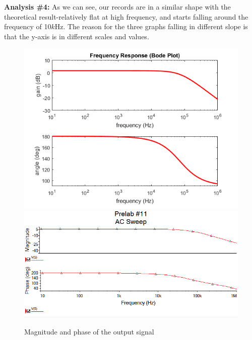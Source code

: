 \textbf{Analysis \#4:} \newline
\phantom{ } As we can see, our records are in a similar shape with the theoretical result-relatively flat at high frequency, and starts falling around the frequency of 10$ \si{k\hertz} $. The reason for the three graphs falling in different slope is that the y-axis is in different scales and values.\\
\begin{figure}[!htbp]
	\centering 
	\begin{framed}
		\includegraphics[width=\linewidth]{prelab/images/9_1.PNG} 
		\includegraphics[width=\linewidth]{prelab/images/11_1.PNG}
		\caption{Magnitude and phase of the output signal}
		\label{fig:pre8} 
	\end{framed}
\end{figure} 

